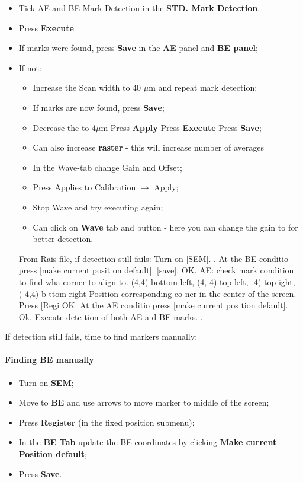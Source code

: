 \begin{itemize}
\item Tick AE and BE Mark Detection in the \textbf{STD.  Mark Detection}.
\item Press \textbf{Execute}
\item If  marks were  found, press  \textbf{Save} in  the \textbf{AE}  panel and
  \textbf{BE panel};
\item If not:
  \begin{itemize}
  \item Increase the Scan width to 40 $\mu$m and repeat mark detection;
  \item If marks are now found, press \textbf{Save};
  \item   Decrease  the   to  4$\mu$m   \ira  Press   \textbf{Apply}  \ira   Press
    \textbf{Execute} \ira Press \textbf{Save};
  \item  Can  also increase  \textbf{raster}  -  this  will increase  number  of
    averages
  \item In the {Wave}-tab change Gain and Offset;
  \item Press {Applies to Calibration}  $\rightarrow$ Apply;
  \item Stop Wave and try executing again;
  \item Can click on \textbf{Wave} tab and button - here you can change the gain
    to for better detection.
  \end{itemize}
  \begin{framed}\noindent
    From Rais  file, if  detection still  fails: Turn  on [SEM].   .  At  the BE
    conditio press [make current posit on default].  [save].  OK. AE: check mark
    condition to  find wha corner  to align to.  {(4,4)-bottom  left, (4,-4)-top
      left, -4)-top ight, (-4,4)-b ttom  right} Position corresponding co ner in
    the center of  the screen.  Press [Regi  OK. At the AE  conditio press [make
    current pos tion default].  Ok.  Execute dete  tion of both AE a d BE marks.
    .
  \end{framed}
\end{itemize}

If detection still fails, time to find markers manually:

\paragraph{Finding BE manually}
\begin{itemize}
\item Turn on \textbf{SEM};
\item Move to \textbf{BE} and use arrows to move marker to middle of the screen;
\item Press \textbf{Register} (in the fixed position submenu);
\item In the \textbf{BE Tab} update  the BE coordinates by clicking \textbf{Make
    current Position default};
\item Press \textbf{Save}.
\end{itemize}

